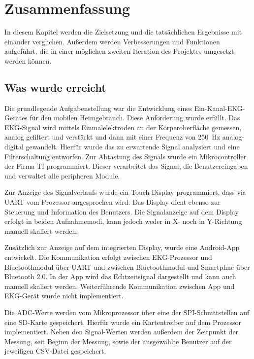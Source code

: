 
\section{Zusammenfassung}

In diesem Kapitel werden die Zielsetzung und die tatsächlichen Ergebnisse mit einander verglichen. Außerdem werden Verbesserungen und Funktionen aufgeführt, die in einer möglichen zweiten Iteration des Projektes umgesetzt werden können.

\subsection{Was wurde erreicht}

Die grundlegende Aufgabenstellung war die Entwicklung eines Ein-Kanal-EKG-Gerätes für den mobilen Heimgebrauch. Diese Anforderung wurde erfüllt. Das EKG-Signal wird mittels Einmalelektroden an der Körperoberfläche gemessen, analog gefiltert und verstärkt und dann mit einer Frequenz von \SI{250}{\hertz} analog-digital gewandelt. Hierfür wurde das zu erwartende Signal analysiert und eine Filterschaltung entworfen. Zur Abtastung des Signals wurde ein Mikrocontroller der Firma TI programmiert. Dieser verarbeitet das Signal, die Benutzereingaben und verwaltet alle peripheren Module. 

Zur Anzeige des Signalverlaufs wurde ein Touch-Display programmiert, dass via UART vom Prozessor angesprochen wird. Das Display dient ebenso zur Steuerung und Information des Benutzers. Die Signalanzeige auf dem Display erfolgt in beiden Aufnahmemodi, kann jedoch weder in X- noch in Y-Richtung manuell skaliert werden. 

Zusätzlich zur Anzeige auf dem integrierten Display, wurde eine Android-App entwickelt. Die Kommunikation erfolgt zwischen EKG-Prozessor und Bluetoothmodul über UART und zwischen Bluetoothmodul und Smartphne über Bluetooth 2.0. In der App wird das Echtzeitsignal dargestellt und kann auch manuell skaliert werden. Weiterführende Kommunikation zwischen App und EKG-Gerät wurde nicht implementiert.

Die ADC-Werte werden vom Mikroprozessor über eine der SPI-Schnittstellen auf eine SD-Karte gespeichert. Hierfür wurde ein Kartentreiber auf dem Prozessor implementiert. Neben den Signal-Werten werden außerdem der Zeitpunkt der Messung, seit Beginn der Messung, sowie der ausgewählte Benutzer auf der jeweiligen CSV-Datei gespeichert. 

